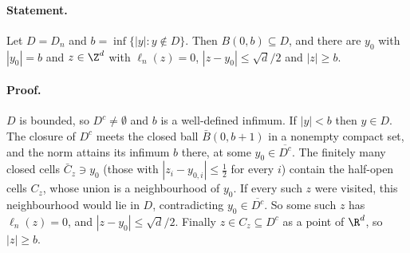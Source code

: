 \paragraph{Statement.} Let $D=D_n$ and $b=\inf\{|y|:y\notin D\}$. Then $B(0,b)\subseteq D$, and there are
$y_0$ with $|y_0|=b$ and $z\in\Z^d$ with $\ell_n(z)=0$, $|z-y_0|\leq\sqrt d/2$ and $|z|\geq b$.
\paragraph{Proof.} $D$ is bounded, so $D^c\neq\emptyset$ and $b$ is a well-defined infimum. If $|y|<b$ then
$y\in D$. The closure of $D^c$ meets the closed ball $\bar B(0,b+1)$ in a nonempty compact set, and the norm
attains its infimum $b$ there, at some $y_0\in\overline{D^c}$. The finitely many closed cells
$\bar C_z\ni y_0$ (those with $|z_i-y_{0,i}|\leq\frac12$ for every $i$) contain the half-open cells
$C_z$, whose union is a neighbourhood of $y_0$. If every such $z$ were visited, this neighbourhood would
lie in $D$, contradicting $y_0\in\overline{D^c}$. So some such $z$ has $\ell_n(z)=0$, and
$|z-y_0|\leq\sqrt d/2$. Finally $z\in C_z\subseteq D^c$ as a point of $\R^d$, so $|z|\geq b$.
